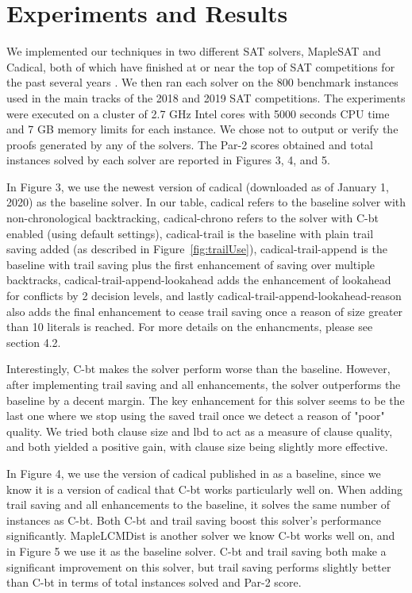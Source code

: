 \documentclass[runningheads]{llncs}
\newcommand{\cbt}{C-bt\xspace}
\begin{document}
\section{Experiments and Results}
We implemented our techniques in two different SAT solvers, MapleSAT and Cadical,
both of which have finished at or near the top of SAT competitions for the past several
years \cite{Heule2019ProceedingsOS}. We then ran each solver on the 800 benchmark instances used
in the main tracks of the 2018 and 2019 SAT competitions. The
experiments were executed on a cluster of 2.7 GHz Intel cores with 5000 seconds CPU time and 7 GB memory limits for each instance. We chose not to output or verify the proofs generated by any of the solvers. The Par-2 scores obtained and total instances solved by each solver are reported in Figures 3, 4, and 5.\newline

In Figure 3, we use the newest version of cadical (downloaded as of January 1, 2020) as the baseline solver. In our table, cadical refers to the baseline solver with non-chronological backtracking, cadical-chrono refers to the solver with \cbt enabled (using default settings), cadical-trail is the baseline with plain trail saving added (as described in Figure~\ref{fig:trailUse}), cadical-trail-append is the baseline with trail saving plus the first enhancement of saving over multiple backtracks, cadical-trail-append-lookahead adds the enhancement of lookahead for conflicts by 2 decision levels, and lastly cadical-trail-append-lookahead-reason also adds the final enhancement to cease trail saving once a reason of size greater than 10 literals is reached. For more details on the enhancments, please see section 4.2.

Interestingly, \cbt makes the solver perform worse than the baseline. However, after implementing trail saving and all enhancements, the solver outperforms the baseline by a decent margin. The key enhancement for this solver seems to be the last one where we stop using the saved trail once we detect a reason of "poor" quality. We tried both clause size and lbd to act as a measure of clause quality, and both yielded a positive gain, with clause size being slightly more effective. \newline

In Figure 4, we use the version of cadical published in
\cite{DBLP:conf/sat/MohleB19} as a baseline, since we know it is a version of cadical that \cbt works particularly well on. When
adding trail saving and all enhancements to the baseline, it solves the same number of instances as
\cbt. Both \cbt and trail saving boost this solver's performance significantly. MapleLCMDist is another solver we know \cbt works well on, and in Figure 5 we use it as the baseline solver. \cbt and trail saving both make a significant improvement on this solver, but trail saving performs slightly better than \cbt in terms of total instances solved and Par-2 score.\newline
\end{document}

